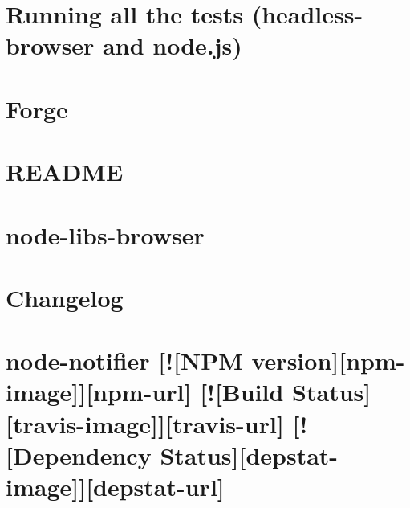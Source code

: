 \documentclass[twoside]{book}
\newcommand{\+}{\discretionary{\mbox{\scriptsize$\hookleftarrow$}}{}{}}
\begin{document}
\chapter{Running all the tests (headless-\/browser and node.\+js)}
\label{md__c_1_workspace_demo_src_main_script_node_modules_node-forge_nodejs__r_e_a_d_m_e}

\chapter{Forge}
\label{md__c_1_workspace_demo_src_main_script_node_modules_node-forge__r_e_a_d_m_e}

\chapter{R\+E\+A\+D\+ME}
\label{md__c_1_workspace_demo_src_main_script_node_modules_node-int64__r_e_a_d_m_e}

\chapter{node-\/libs-\/browser}
\label{md__c_1_workspace_demo_src_main_script_node_modules_node-libs-browser__r_e_a_d_m_e}

\chapter{Changelog}
\label{md__c_1_workspace_demo_src_main_script_node_modules_node-notifier__c_h_a_n_g_e_l_o_g}

\chapter{node-\/notifier \mbox{[}!\mbox{[}N\+PM version\mbox{]}\mbox{[}npm-\/image\mbox{]}\mbox{]}\mbox{[}npm-\/url\mbox{]} \mbox{[}!\mbox{[}Build Status\mbox{]}\mbox{[}travis-\/image\mbox{]}\mbox{]}\mbox{[}travis-\/url\mbox{]} \mbox{[}!\mbox{[}Dependency Status\mbox{]}\mbox{[}depstat-\/image\mbox{]}\mbox{]}\mbox{[}depstat-\/url\mbox{]}}
\label{md__c_1_workspace_demo_src_main_script_node_modules_node-notifier__r_e_a_d_m_e}

\end{document}
